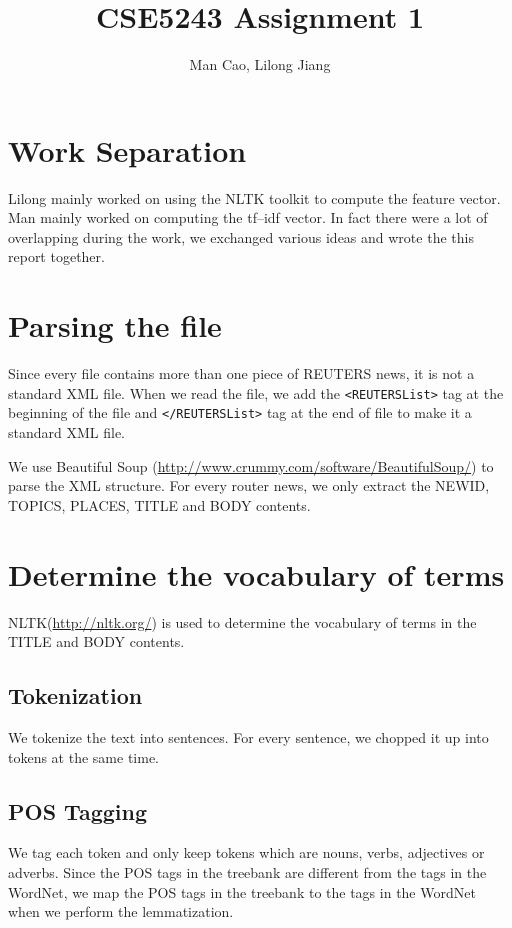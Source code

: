 \documentclass{article}
\newcommand{\code}[1]{\textsf{\smaller\verb~#1~}}
\begin{document}
\title{CSE5243 Assignment 1}
\author{Man Cao, Lilong Jiang}
\maketitle

\section{Work Separation}
Lilong mainly worked on using the NLTK toolkit to compute the feature vector.
Man mainly worked on computing the tf--idf vector. In fact there were a lot of
overlapping during the work, we exchanged various ideas and wrote the this
report together.

\section{Parsing the file}
Since every file contains more than one piece of REUTERS news, it is not
a standard XML file. When we read the file, we add the
\code{<REUTERSList>} tag at the beginning of the file and
\code{</REUTERSList>} tag at the end of file to make it a standard XML
file.

We use Beautiful Soup (\url{http://www.crummy.com/software/BeautifulSoup/}) to
parse the XML structure. For every router news, we only extract the NEWID,
TOPICS, PLACES, TITLE and BODY contents.

\section{Determine the vocabulary of terms}
NLTK(\url{http://nltk.org/}) is used to determine the vocabulary of terms in the
TITLE and BODY contents.

\subsection{Tokenization}
We tokenize the text into sentences. For every sentence, we chopped it up into
tokens at the same time.

\subsection{POS Tagging}
We tag each token and only keep tokens which are nouns, verbs, adjectives or
adverbs.
Since the POS tags in the treebank are different from the tags in the WordNet,
we map the POS tags in the treebank to the tags in the WordNet when we perform
the lemmatization.
\end{document}
